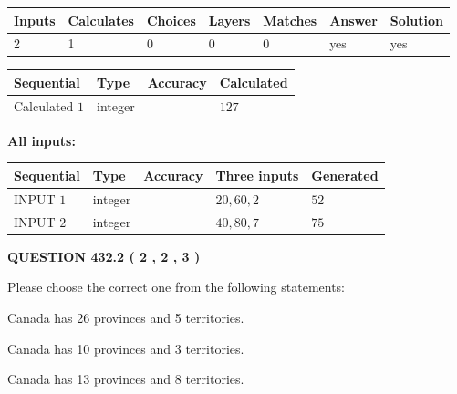 \documentclass[12pt]{article}
\begin{document}
   
\noindent\begin{tabular}{|l|l|l|l|l|l|l|}
 \hline
Inputs & Calculates & Choices & Layers & Matches & Answer & Solution \\ \hline
 2  & 
 1  & 
 0
  & 
 0  & 
 0  & 
  yes & 
  yes 
  \\ \hline
 \end{tabular}
   
   
   
   
\noindent{}
   
   
  
  
\noindent\begin{tabular}{|l|l|l|l|}
\hline
 Sequential & Type & Accuracy & Calculated \\ 
\hline
 
 
  Calculated $  1 $ & integer &  & 
  $ 127 $ 
 \\  \hline  
 \end{tabular}
   
   
   
   
\noindent\vspace{0.1in}\hspace{-0.08in} {\textbf{\Large{All inputs: }}}
   
   
  
  
\noindent\begin{tabular}{|l|l|l|l|l|}
\hline
 Sequential & Type & Accuracy & Three inputs & Generated \\ 
\hline
 
 
  INPUT $  1 $ & integer &  & $
 20
 , 
 60
 , 
 2
 $ & $ 52 $ 
 \\  \hline  
 
 
  INPUT $  2 $ & integer &  & $
 40
 , 
 80
 , 
 7
 $ & $ 75 $ 
 \\  \hline  
 \end{tabular}
   
   
  
\vspace{0.2in}
  
{\textbf{\Large{QUESTION
432.2 
 ( 2 , 2 , 3 )
}}}
  
  
Please choose the correct one from the following statements:
 
 
Canada has  26 provinces and  5 territories.
 
 
Canada has 10  provinces and 3 territories.
 
 
Canada has  13 provinces and  8 territories.
 
\end{document}
